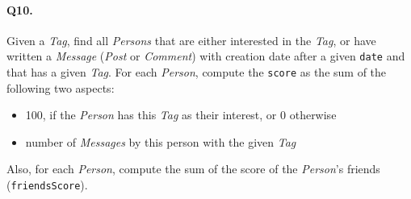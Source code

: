 \paragraph{Q10.}
Given a \emph{Tag}, find all \emph{Persons} that are either interested
in the \emph{Tag}, or have written a \emph{Message} (\emph{Post} or
\emph{Comment}) with creation date after a given \texttt{date} and that
has a given \emph{Tag}. For each \emph{Person}, compute the
\texttt{score} as the sum of the following two aspects:
\begin{itemize}
\tightlist
\item
  100, if the \emph{Person} has this \emph{Tag} as their interest, or 0
  otherwise
\item
  number of \emph{Messages} by this person with the given \emph{Tag}
\end{itemize}
Also, for each \emph{Person}, compute the sum of the score of the
\emph{Person}'s friends (\texttt{friendsScore}).
